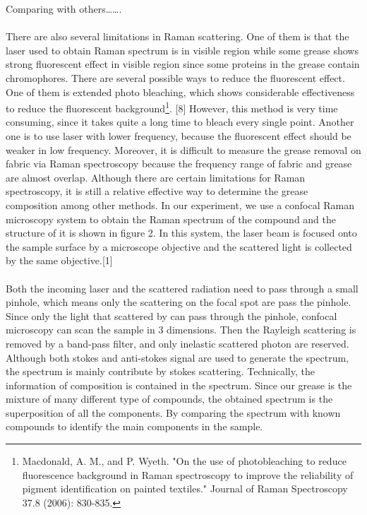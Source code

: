 \documentclass[a4paper ,12pt]{article}
\begin{document}
Comparing with others…….\\\\There are also several limitations in Raman scattering. One of them is that the laser used to obtain Raman spectrum is in visible region while some grease shows strong fluorescent effect in visible region since some proteins in the grease contain chromophores. There are several possible ways to reduce the fluorescent effect. One of them is extended photo bleaching, which shows considerable effectiveness to reduce the fluorescent background\footnote{Macdonald, A. M., and P. Wyeth. "On the use of photobleaching to reduce fluorescence background in Raman spectroscopy to improve the reliability of pigment identification on painted textiles." Journal of Raman Spectroscopy 37.8 (2006): 830-835.}. [8] However, this method is very time consuming, since it takes quite a long time to bleach every single point.  Another one is to use laser with lower frequency, because the fluorescent effect should be weaker in low frequency. Moreover, it is difficult to measure the grease removal on fabric via Raman spectroscopy because the frequency range of fabric and grease are almost overlap. Although there are certain limitations for Raman spectroscopy, it is still a relative effective way to determine the grease composition among other methods.  In our experiment, we use a confocal Raman microscopy system to obtain the Raman spectrum of the compound and the structure of it is shown in figure 2. In this system, the laser beam is focused onto the sample surface by a microscope objective and the scattered light is collected by the same objective.[1]\\\\Both the incoming laser and the scattered radiation need to pass through a small pinhole, which means only the scattering on the focal spot are pass the pinhole. Since only the light that scattered by can pass through the pinhole, confocal microscopy can scan the sample in 3 dimensions. Then the Rayleigh scattering is removed by a band-pass filter, and only inelastic scattered photon are reserved. Although both stokes and anti-stokes signal are used to generate the spectrum, the spectrum is mainly contribute by stokes scattering.  
Technically, the information of composition is contained in the spectrum. Since our grease is the mixture of many different type of compounds, the obtained spectrum is the superposition of all the components. By comparing the spectrum with known compounds to identify the main components in the sample. 
\end{document}
